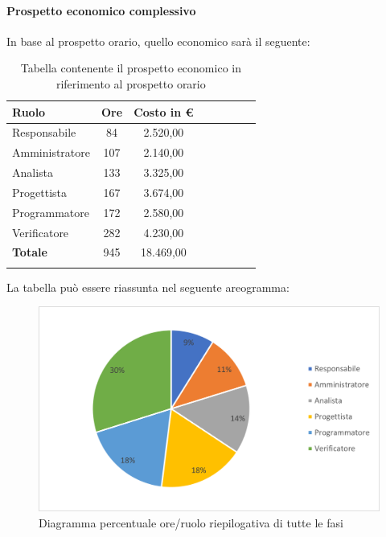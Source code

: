 \paragraph{Prospetto economico complessivo}
In base al prospetto orario, quello economico sarà il seguente:

\begin{longtable}{|l|c|c|c|c|c|c|c|}
	\hline
	\rowcolor{lighter-grayer}
	\textbf{Ruolo}  & \textbf{Ore} & \textbf{Costo in €} \\
	\hline
	\endfirsthead

	\hline
	Responsabile    & 84           & 2.520,00            \\
	\hline
	\hline
	Amministratore  & 107          & 2.140,00            \\
	\hline
	\hline
	Analista        & 133          & 3.325,00            \\
	\hline
	\hline
	Progettista     & 167          & 3.674,00            \\
	\hline
	\hline
	Programmatore   & 172          & 2.580,00            \\
	\hline
	\hline
	Verificatore    & 282          & 4.230,00            \\
	\hline
	\hline
	\textbf{Totale} & 945          & 18.469,00           \\
	\hline
	\rowcolor{white}
	\caption{Tabella contenente il prospetto economico in riferimento al prospetto orario}
\end{longtable}
\pagebreak

La tabella può essere riassunta nel seguente areogramma:
\begin{figure}[H]
	\centering
	\includegraphics[width=0.8\linewidth]{res/images/preventivo/tot2.png}
	\caption{Diagramma percentuale ore/ruolo riepilogativa di tutte le fasi}
	\label{fig:diagramma costi ruolo riepilogativa di tutte le fasi}
\end{figure}

